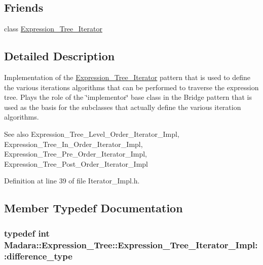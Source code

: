 \subsection*{Friends}
\begin{DoxyCompactItemize}
\item 
class \hyperlink{classMadara_1_1Expression__Tree_1_1Expression__Tree__Iterator__Impl_adfe8d209b4dd64ac100d4c9c9adf08c1}{Expression\_\-Tree\_\-Iterator}
\end{DoxyCompactItemize}


\subsection{Detailed Description}
Implementation of the \hyperlink{classMadara_1_1Expression__Tree_1_1Expression__Tree__Iterator}{Expression\_\-Tree\_\-Iterator} pattern that is used to define the various iterations algorithms that can be performed to traverse the expression tree. Plays the role of the \char`\"{}implementor\char`\"{} base class in the Bridge pattern that is used as the basis for the subclasses that actually define the various iteration algorithms.

\begin{DoxySeeAlso}{See also}
Expression\_\-Tree\_\-Level\_\-Order\_\-Iterator\_\-Impl, Expression\_\-Tree\_\-In\_\-Order\_\-Iterator\_\-Impl, Expression\_\-Tree\_\-Pre\_\-Order\_\-Iterator\_\-Impl, Expression\_\-Tree\_\-Post\_\-Order\_\-Iterator\_\-Impl 
\end{DoxySeeAlso}


Definition at line 39 of file Iterator\_\-Impl.h.



\subsection{Member Typedef Documentation}
\hypertarget{classMadara_1_1Expression__Tree_1_1Expression__Tree__Iterator__Impl_ae0238cb942a1398b7cd91dffe4c5ba3c}{
\subsubsection[{difference\_\-type}]{\setlength{\rightskip}{0pt plus 5cm}typedef int {\bf Madara::Expression\_\-Tree::Expression\_\-Tree\_\-Iterator\_\-Impl::difference\_\-type}}}
\label{d0/dd7/classMadara_1_1Expression__Tree_1_1Expression__Tree__Iterator__Impl_ae0238cb942a1398b7cd91dffe4c5ba3c}



